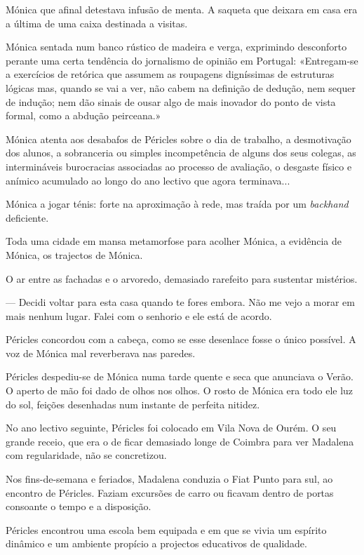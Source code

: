 Mónica que afinal detestava infusão de menta. A saqueta que deixara em
casa era a última de uma caixa destinada a visitas.

Mónica sentada num banco rústico de madeira e verga, exprimindo
desconforto perante uma certa tendência do jornalismo de opinião em
Portugal: «Entregam-se a exercícios de retórica que assumem as roupagens
digníssimas de estruturas lógicas mas, quando se vai a ver, não cabem na
definição de dedução, nem sequer de indução; nem dão sinais de ousar
algo de mais inovador do ponto de vista formal, como a abdução
peirceana.»

Mónica atenta aos desabafos de Péricles sobre o dia de trabalho, a
desmotivação dos alunos, a sobranceria ou simples incompetência de
alguns dos seus colegas, as intermináveis burocracias associadas ao
processo de avaliação, o desgaste físico e anímico acumulado ao longo do
ano lectivo que agora terminava...

Mónica a jogar ténis: forte na aproximação à rede, mas
traída por um \emph{backhand }deficiente.

Toda uma cidade em mansa metamorfose para acolher Mónica, a evidência de
Mónica, os trajectos de Mónica.

O ar entre as fachadas e o arvoredo, demasiado rarefeito para sustentar
mistérios.

--- Decidi voltar para esta casa quando te fores embora. Não me vejo a
morar em mais nenhum lugar. Falei com o senhorio e ele está de acordo.

Péricles concordou com a cabeça, como se esse desenlace fosse o único
possível. A voz de Mónica mal reverberava nas paredes.

Péricles despediu-se de Mónica numa tarde quente e seca que anunciava o
Verão. O aperto de mão foi dado de olhos nos olhos. O rosto de Mónica
era todo ele luz do sol, feições desenhadas num instante de perfeita
nitidez.

No ano lectivo seguinte, Péricles foi colocado em Vila Nova de Ourém. O
seu grande receio, que era o de ficar demasiado longe de Coimbra para
ver Madalena com regularidade, não se concretizou.

Nos fins-de-semana e feriados, Madalena conduzia o Fiat Punto para sul,
ao encontro de Péricles. Faziam excursões de carro ou ficavam dentro de
portas consoante o tempo e a disposição.

Péricles encontrou uma escola bem equipada e em que se vivia um espírito
dinâmico e um ambiente propício a projectos educativos de qualidade.

